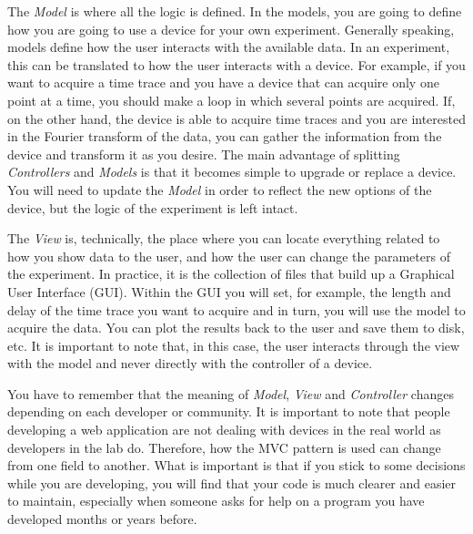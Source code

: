 The \emph{Model} is where all the logic is defined. In the models, you
are going to define how you are going to use a device for your own
experiment. Generally speaking, models define how the user interacts
with the available data. In an experiment, this can be translated to how
the user interacts with a device. For example, if you want to acquire a
time trace and you have a device that can acquire only one point at a
time, you should make a loop in which several points are acquired. If,
on the other hand, the device is able to acquire time traces and you are
interested in the Fourier transform of the data, you can gather the
information from the device and transform it as you desire. The main
advantage of splitting \emph{Controllers} and \emph{Models} is that it
becomes simple to upgrade or replace a device. You will need to update
the \emph{Model} in order to reflect the new options of the device, but
the logic of the experiment is left intact.

The \emph{View} is, technically, the place where you can locate
everything related to how you show data to the user, and how the user
can change the parameters of the experiment. In practice, it is the
collection of files that build up a Graphical User Interface ({GUI}).
Within the {GUI} you will set, for example, the length and delay of the
time trace you want to acquire and in turn, you will use the model to
acquire the data. You can plot the results back to the user and save
them to disk, etc. It is important to note that, in this case, the user
interacts through the view with the model and never directly with the
controller of a device.


You have to remember that the meaning of \emph{Model}, \emph{View} and
\emph{Controller} changes depending on each developer or community. It
is important to note that people developing a web application are not
dealing with devices in the real world as developers in the lab do.
Therefore, how the {MVC} pattern is used can change from one field to
another. What is important is that if you stick to some decisions while
you are developing, you will find that your code is much clearer and
easier to maintain, especially when someone asks for help on a program
you have developed months or years before.

